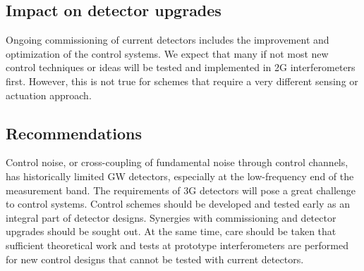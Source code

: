 
\subsection{Impact on detector upgrades}
Ongoing commissioning of current detectors includes the improvement and optimization of the control systems. We expect that many if not most new control techniques or ideas will be tested and implemented in 2G interferometers first. However, this is not true for schemes that require a very different sensing or actuation approach.

\subsection{Recommendations}
Control noise, or cross-coupling of fundamental noise through control channels, has historically limited GW detectors, especially at the low-frequency end of the measurement band. The requirements of 3G detectors will pose a great challenge to control systems. Control schemes should be developed and tested early as an integral part of detector designs. Synergies with commissioning and detector upgrades should be sought out. At the same time, care should be taken that sufficient theoretical work and tests at prototype interferometers are performed for new control designs that cannot be tested with current detectors.
